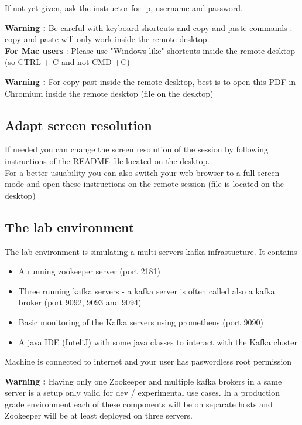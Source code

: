 \documentclass{article}
\newenvironment{warning}
    { \begin{mdframed}[backgroundcolor=blue!20] \textbf{Warning : } }
    {  \end{mdframed}}
\begin{document}
If not yet given, ask the instructor for ip, username and password. 

\begin{warning}
Be careful with keyboard shortcuts and copy and paste commands : copy and paste will only work inside the remote desktop.\\
\textbf{For Mac users} : Please use "Windows like" shortcuts inside the remote desktop (so CTRL + C and not CMD +C)  
\end{warning}

\begin{warning}
For copy-past inside the remote desktop, best is to open this PDF in Chromium inside the remote desktop (file on the desktop)
\end{warning}

\subsection{Adapt screen resolution}
If needed you can change the screen resolution of the session by following instructions of the README file located on the desktop. \\
For a better usuability you can also switch your web browser to a full-screen mode and open these instructions on the remote session (file is located on the desktop)

\subsection{The lab environment}

The lab environment is simulating a multi-servers kafka infrastucture. It contains 
\begin{itemize}
\item A running zookeeper server (port 2181)
\item Three running kafka servers - a kafka server is often called also a kafka broker  (port 9092, 9093 and 9094)
\item Basic monitoring of the Kafka servers using prometheus (port 9090) 
\item A java IDE (InteliJ) with some java classes to interact with the Kafka cluster
\end{itemize}

Machine is connected to internet and your user has paswordless root permission

\begin{warning}
Having only one Zookeeper and multiple kafka brokers in a same server is a setup only valid for dev / experimental use cases. In a production grade environment each of these components will be on separate hosts and Zookeeper will be at least deployed on three servers.
\end{warning}
\end{document}
